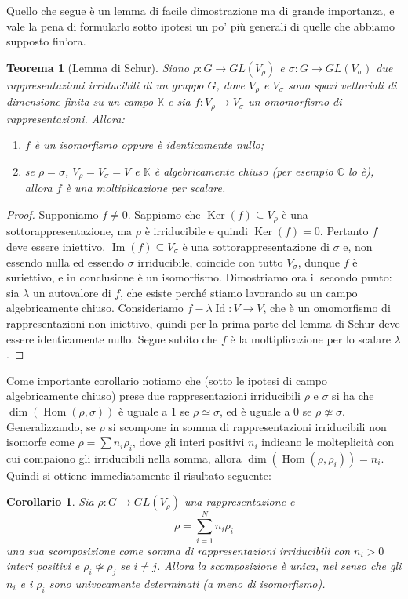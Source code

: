 \documentclass[11pt]{article}
\theoremstyle{plain}
\newtheorem{thm}{Teorema}[section]
\newtheorem*{cor}{Corollario}
\theoremstyle{definition}
\theoremstyle{remark}
\newcommand{\C}{\mathbb{C}}
\newcommand{\K}{\mathbb{K}}
\newcommand{\dsum}{\displaystyle\sum}
\DeclareMathOperator{\Hom}{Hom}
\DeclareMathOperator{\Ker}{Ker}
\DeclareMathOperator{\Imm}{Im}
\DeclareMathOperator{\Id}{Id}
\DeclareMathOperator{\iso}{\simeq}
\DeclareMathOperator{\noniso}{\not\simeq}
\begin{document}
Quello che segue è un lemma di facile dimostrazione ma di grande importanza, e vale la pena di formularlo 
sotto ipotesi un po' più generali di quelle che abbiamo supposto fin'ora.
\begin{thm}[Lemma di Schur]
Siano $\rho: G \to GL(V_\rho)$ e $\sigma: G \to GL(V_\sigma)$ due rappresentazioni irriducibili di un gruppo $G$, dove $V_\rho$ e $V_\sigma$ sono spazi vettoriali di dimensione finita su un campo $\K$ e sia $f:V_\rho \to V_\sigma$ un omomorfismo di rappresentazioni. Allora:
\begin{enumerate}
\item $f$ è un isomorfismo oppure è identicamente nullo;
\item se $\rho=\sigma$, $V_\rho=V_\sigma=V$ e $\K$ è algebricamente chiuso (per esempio $\C$ lo è), allora $f$ è una moltiplicazione per scalare.
\end{enumerate}
\end{thm}
\begin{proof}
Supponiamo $f\neq 0$. Sappiamo che $\Ker(f)\subseteq V_\rho$ è una sottorappresentazione, ma $\rho$ è irriducibile e quindi $\Ker(f)=0$.
Pertanto $f$ deve essere iniettivo. $\Imm(f)\subseteq V_{\sigma}$ è una sottorappresentazione di $\sigma$ e, non essendo nulla ed essendo $\sigma$ irriducibile, coincide con tutto $V_\sigma$, dunque $f$ è suriettivo, e in conclusione è un isomorfismo.\newline
Dimostriamo ora il secondo punto: sia $\lambda$ un autovalore di $f$, che esiste perché stiamo lavorando su un campo algebricamente chiuso.
Consideriamo $f-\lambda \Id:V\to V$, che è un omomorfismo di rappresentazioni non iniettivo, quindi per la prima parte del lemma di Schur deve essere identicamente nullo. Segue subito che $f$ è la moltiplicazione per lo scalare $\lambda$.
\end{proof}

Come importante corollario notiamo che (sotto le ipotesi di campo algebricamente chiuso) prese due rappresentazioni irriducibili $\rho$ e $\sigma$ si ha che $\dim\left(\Hom(\rho,\sigma)\right)$ è uguale a 1 se $\rho\iso\sigma$, ed è uguale a 0 se $\rho\noniso\sigma$.
Generalizzando, se $\rho$ si scompone in somma di rappresentazioni irriducibili non isomorfe come $\rho=\sum n_i\rho_i$, dove gli interi positivi $n_i$ indicano le molteplicità con cui compaiono gli irriducibili nella somma, allora $\dim\left(\Hom(\rho,\rho_i)\right)=n_i$.
Quindi si ottiene immediatamente il risultato seguente:
\begin{cor}
Sia $\rho: G \to GL(V_\rho)$ una rappresentazione e
\[\rho = \dsum_{i=1}^N n_i \rho_i \]
una sua scomposizione come somma di rappresentazioni irriducibili con $n_i>0$ interi positivi e $\rho_i\noniso\rho_j$ se $i\neq j$. Allora la scomposizione è unica, nel senso che gli $n_i$ e i $\rho_i$ sono univocamente determinati (a meno di isomorfismo).
\end{cor}
\end{document}
